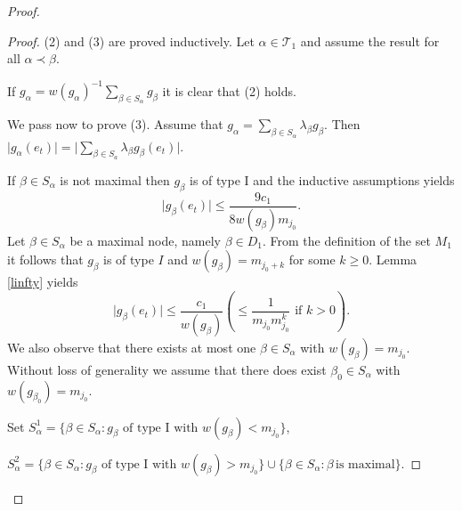 \documentclass[a4paper]{amsart}
\theoremstyle{plain}
\newcommand{\ga}{g_{\alpha}}
\newcommand{\gb}{g_{\beta}}
\begin{document}
\begin{proof}
\begin{proof}
(2) and (3) are proved inductively.   Let $\alpha\in\mathcal{T}_1$ and assume the result
for all $\alpha\prec\beta$.

If $\ga=w(\ga)^{-1}\sum_{\beta\in S_{\alpha}}\gb$  it is  clear that (2) holds.

We pass now to prove (3). Assume that  $\ga=\sum_{\beta\in S_{\alpha}}\lambda_{\beta}\gb$. Then $\vert \ga(e_t)\vert
=\vert\sum_{\beta\in S_{a}}\lambda_{\beta}\gb(e_t)\vert$.

If   $\beta\in S_{\alpha}$  is not  maximal then $\gb$ is of type I and the inductive
assumptions yields
\begin{equation}\label{bv0}
\vert \gb(e_t)\vert\leq\frac{9c_{1}}{8w(\gb)m_{j_0}}.
\end{equation}
Let  $\beta\in S_{\alpha}$ be a maximal node, namely $\beta\in D_1$. From the definition of the set $M_{1}$ it follows
that  $\gb$ is of type  $I$ and $w(\gb)=m_{j_0+k}$ for some $k\geq
0$.  Lemma \ref{linfty} yields
\begin{equation}\label{bv}
\vert\gb(e_t)\vert\leq\frac{c_{1}}{w(\gb)}(\leq\frac{1}{m_{j_0}m_{j_0}^{k}} \mbox{ if $k>0$}).
\end{equation}
We also observe  that there exists at most one $\beta\in S_{\alpha}$  with
$w(\gb)=m_{j_0}$. Without loss of generality we assume that there does exist $\beta_0\in
S_{\alpha}$ with $w(g_{\beta_0})=m_{j_0}$.

Set $S_{\alpha}^{1}=\{\beta\in S_{\alpha}:\text{$\gb$ of type I with $w(\gb)<m_{j_0}$}\}$,


$S_{\alpha}^{2}=\{\beta\in S_{\alpha}:\text{$\gb$ of type I with $w(\gb)>m_{j_0}$}\}\cup\{\beta\in S_{\alpha}: \beta\,\text{is maximal}\}$.



\end{proof}
\end{proof}
\end{document}
